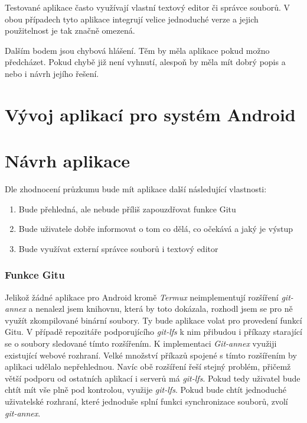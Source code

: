     Testované aplikace často využívají vlastní textový editor či správce souborů. V obou případech tyto aplikace integrují velice jednoduché verze a jejich použitelnost je tak značně omezená.

    Dalším bodem jsou chybová hlášení. Těm by měla aplikace pokud možno předcházet. Pokud chybě již není vyhnutí, alespoň by měla mít dobrý popis a nebo i návrh jejího řešení.

\chapter{Vývoj aplikací pro systém Android}
\chapter{Návrh aplikace}
    Dle zhodnocení průzkumu bude mít aplikace další následující vlastnosti:
    \begin{enumerate}
        \item Bude přehledná, ale nebude příliš zapouzdřovat funkce Gitu
        \item Bude uživatele dobře informovat o tom co dělá, co očekává a jaký je výstup
        \item Bude využívat externí správce souborů i textový editor
    \end{enumerate}

    \subsection{Funkce Gitu}
    Jelikož žádné aplikace pro Android kromě \emph{Termux} neimplementují rozšíření \emph{git-annex} a nenalezl jsem knihovnu, která by toto dokázala, rozhodl jsem se pro ně využít zkompilované binární soubory. Ty bude aplikace volat pro provedení funkcí Gitu.
    V případě repozitáře podporujícího \emph{git-lfs} k nim přibudou i příkazy starající se o soubory sledované tímto rozšířením. K implementaci \emph{Git-annex} využiji existující webové rozhraní. Velké množství příkazů spojené s tímto rozšířením by aplikaci udělalo nepřehlednou. Navíc obě rozšíření řeší stejný problém, přičemž větší podporu od ostatních aplikací i serverů má \emph{git-lfs}. Pokud tedy uživatel bude chtít mít vše plně pod kontrolou, využije \emph{git-lfs}. Pokud bude chtít jednoduché uživatelské rozhraní, které jednoduše splní funkci synchronizace souborů, zvolí \emph{git-annex}.

